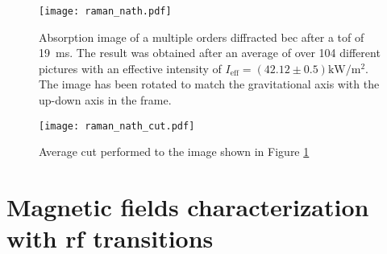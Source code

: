 \begin{figure}[!htbp]\centering
	\texttt{[image: raman\_nath.pdf]}
	\caption[Absorption image of a multiple orders diffracted \ac{bec} after a \ac{tof} of \SI{19}{\milli\second}]{Absorption image of a multiple orders diffracted \ac{bec} after a \ac{tof} of \SI{19}{\milli\second}. The result was obtained after an average of over 104 different pictures with an effective intensity of $I_\text{eff} = (42.12 \pm 0.5)\si{\kilo\watt\per\meter\squared}$. The image has been rotated to match the gravitational axis with the up-down axis in the frame.}\label{fig:raman_nath_cut}\label{fig:raman_nath}
\end{figure}

\begin{figure}[!htbp]\centering
	\texttt{[image: raman\_nath\_cut.pdf]}
	\caption[Average cut performed to the image shown in Figure \ref{fig:raman_nath}]{Average cut performed to the image shown in Figure \ref{fig:raman_nath}}
\end{figure}

\pagebreak

\section{Magnetic fields characterization with \acs{rf} transitions}

